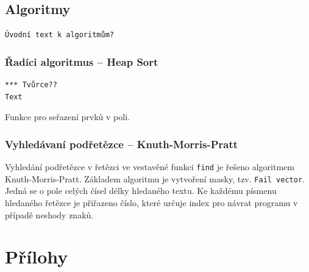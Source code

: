\documentclass[a4paper, 12pt]{article}
\begin{document}
\subsection{Algoritmy}

\begin{verbatim}
Úvodní text k algoritmům?
\end{verbatim}

\subsubsection{Řadíci algoritmus -- Heap Sort}
\begin{verbatim}
*** Tvůrce??
Text
\end{verbatim}
Funkce pro seřazení prvků v poli.

\subsubsection{Vyhledávaní podřetězce -- Knuth-Morris-Pratt}
Vyhledání podřetězce v řetězci ve vestavěné funkci \texttt{find} je řešeno
algoritmem Knuth-Morris-Pratt. Základem algoritmu je vytvoření masky, tzv.
\texttt{Fail vector}. Jedná se o pole celých čísel délky hledaného textu. Ke
každému písmenu hledaného řetězce je přiřazeno číslo, které určuje index pro návrat programu
v případě neshody znaků.

\newpage
\section{Přílohy} \label{prilohy}

\renewcommand\thesubsection{\thesection.\Alph{subsection}}

\end{document}
